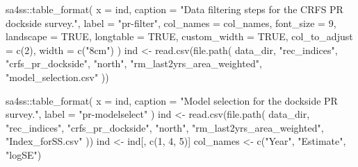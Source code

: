 \documentclass[
  letterpaper,
]{article}
\newenvironment{Shaded}{\begin{snugshade}}{\end{snugshade}}
\newcommand{\AttributeTok}[1]{\textcolor[rgb]{0.77,0.63,0.00}{#1}}
\newcommand{\ConstantTok}[1]{\textcolor[rgb]{0.00,0.00,0.00}{#1}}
\newcommand{\DecValTok}[1]{\textcolor[rgb]{0.00,0.00,0.81}{#1}}
\newcommand{\FunctionTok}[1]{\textcolor[rgb]{0.00,0.00,0.00}{#1}}
\newcommand{\NormalTok}[1]{#1}
\newcommand{\OtherTok}[1]{\textcolor[rgb]{0.56,0.35,0.01}{#1}}
\newcommand{\SpecialCharTok}[1]{\textcolor[rgb]{0.00,0.00,0.00}{#1}}
\newcommand{\StringTok}[1]{\textcolor[rgb]{0.31,0.60,0.02}{#1}}
\begin{document}
\begin{Shaded}
\begin{Highlighting}[]
\NormalTok{sa4ss}\SpecialCharTok{::}\FunctionTok{table\_format}\NormalTok{(}
  \AttributeTok{x =}\NormalTok{ ind,}
  \AttributeTok{caption =} \StringTok{"Data filtering steps for the CRFS PR dockside survey."}\NormalTok{,}
  \AttributeTok{label =} \StringTok{"pr{-}filter"}\NormalTok{,}
  \AttributeTok{col\_names =}\NormalTok{ col\_names,}
  \AttributeTok{font\_size =} \DecValTok{9}\NormalTok{,}
  \AttributeTok{landscape =} \ConstantTok{TRUE}\NormalTok{,}
  \AttributeTok{longtable =} \ConstantTok{TRUE}\NormalTok{,}
  \AttributeTok{custom\_width =} \ConstantTok{TRUE}\NormalTok{,}
  \AttributeTok{col\_to\_adjust =} \FunctionTok{c}\NormalTok{(}\DecValTok{2}\NormalTok{),}
  \AttributeTok{width =} \FunctionTok{c}\NormalTok{(}\StringTok{"8cm"}\NormalTok{)}
\NormalTok{)}
\NormalTok{ind }\OtherTok{\textless{}{-}} \FunctionTok{read.csv}\NormalTok{(}\FunctionTok{file.path}\NormalTok{(}
\NormalTok{  data\_dir, }\StringTok{"rec\_indices"}\NormalTok{, }\StringTok{"crfs\_pr\_dockside"}\NormalTok{, }\StringTok{"north"}\NormalTok{, }\StringTok{"rm\_last2yrs\_area\_weighted"}\NormalTok{,}
  \StringTok{"model\_selection.csv"}
\NormalTok{))}

\NormalTok{sa4ss}\SpecialCharTok{::}\FunctionTok{table\_format}\NormalTok{(}
  \AttributeTok{x =}\NormalTok{ ind,}
  \AttributeTok{caption =} \StringTok{"Model selection for the dockside PR survey."}\NormalTok{,}
  \AttributeTok{label =} \StringTok{"pr{-}modelselect"}
\NormalTok{)}
\NormalTok{ind }\OtherTok{\textless{}{-}} \FunctionTok{read.csv}\NormalTok{(}\FunctionTok{file.path}\NormalTok{(}
\NormalTok{  data\_dir, }\StringTok{"rec\_indices"}\NormalTok{, }\StringTok{"crfs\_pr\_dockside"}\NormalTok{,}
  \StringTok{"north"}\NormalTok{, }\StringTok{"rm\_last2yrs\_area\_weighted"}\NormalTok{, }\StringTok{"Index\_forSS.csv"}
\NormalTok{))}
\NormalTok{ind }\OtherTok{\textless{}{-}}\NormalTok{ ind[, }\FunctionTok{c}\NormalTok{(}\DecValTok{1}\NormalTok{, }\DecValTok{4}\NormalTok{, }\DecValTok{5}\NormalTok{)]}
\NormalTok{col\_names }\OtherTok{\textless{}{-}} \FunctionTok{c}\NormalTok{(}\StringTok{"Year"}\NormalTok{, }\StringTok{"Estimate"}\NormalTok{, }\StringTok{"logSE"}\NormalTok{)}


\end{Highlighting}
\end{Shaded}
\end{document}
